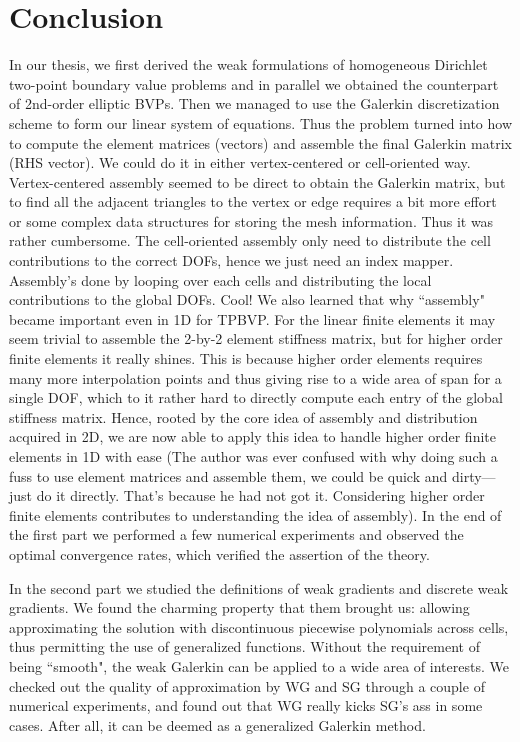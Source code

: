 	
	\clearpage
	\section{Conclusion}\lhead{\leftmark}
	In our thesis, we first derived the weak formulations of homogeneous 
	Dirichlet two-point boundary value problems and in parallel we obtained
	the	counterpart of 2nd-order elliptic BVPs. Then we managed to use the
	Galerkin discretization scheme to form our linear system of equations.
	Thus the problem turned into how to compute the element matrices (vectors) 
	and assemble the final Galerkin matrix (RHS vector). We could do it in 
	either vertex-centered or cell-oriented way. Vertex-centered assembly
	seemed to be direct to obtain the Galerkin matrix, but to find all the
	adjacent triangles to the vertex or edge requires a bit more effort or
	some complex data structures for storing the mesh information. Thus it
	was rather cumbersome. The cell-oriented assembly only need to distribute
	the cell contributions to the correct DOFs, hence we just need an index 
	mapper. Assembly's done by looping over each cells and distributing the 
	local contributions to the global DOFs. Cool! We also learned that why 
	``assembly" became important even in 1D for TPBVP. For the linear finite
	elements it may seem trivial to assemble the 2-by-2 element stiffness 
	matrix, but for higher order finite elements it really shines. This is
	because higher order elements requires many more interpolation points and 
	thus giving rise to a wide area of span for a single DOF, which to it 
	rather hard to directly compute each entry of the global stiffness matrix.  
	Hence, rooted by the core idea of assembly and distribution acquired in 2D,
	we are now able to apply this idea to handle higher order finite elements 
	in 1D with ease (The author was ever confused with why doing such a fuss to 
	use element matrices and assemble them, we could be quick and dirty---just 
	do it directly. That's because he had not got it. Considering higher order 
	finite elements contributes to understanding the idea of assembly). In the 
	end of the first part we performed a few numerical experiments and observed 
	the optimal convergence rates, which verified the assertion of the theory. 
	
	In the second part we studied the definitions of weak gradients and
	discrete weak gradients. We found the charming property that them brought
	us: allowing approximating the solution with discontinuous piecewise 
	polynomials across cells, thus permitting the use of generalized functions. 
	Without the requirement of being ``smooth", the weak Galerkin can be 
	applied to a wide area of interests. We checked out the quality of 
	approximation by WG and SG through a couple of numerical experiments, and 
	found out that WG really kicks SG's ass in some cases. After all, it can be 
	deemed as a generalized Galerkin method.
	
